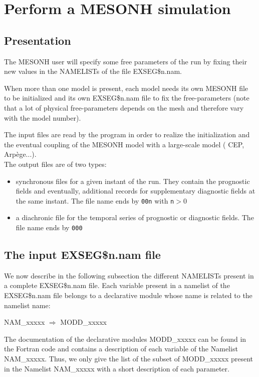 \chapter{ Perform a MESONH simulation} \label{ch:model}


\section{Presentation}

The MESONH user will  
specify some free parameters of the run by fixing their new values in the
NAMELISTs of the file EXSEG\$n.nam. 

When more than one model is present, each model needs its own MESONH file to be
initialized and its own EXSEG\$n.nam file to fix the free-parameters (note that a lot
of physical free-parameters depends on the mesh and therefore vary with the
model number). 

The input files are read by the program in order to realize the initialization and
the eventual coupling of the
MESONH model with a large-scale model ( CEP, Arp\`ege...). \\

The output files are of two types:
\begin{itemize}
\item
synchronous files for a given instant of the run. They contain the prognostic
fields and  eventually,
additional records for supplementary diagnostic  fields at the same instant.
The file name ends by {\tt 00n} with {\tt n}$>$0
\item
a diachronic file for the temporal series of prognostic or diagnostic fields.
The file name ends by {\tt 000}
\end{itemize}

\section{The input EXSEG\$n.nam file}
We now describe in the following subsection the different NAMELISTs present in 
a complete EXSEG\$n.nam file. 
Each variable present in a namelist of the EXSEG\$n.nam file
belongs to a declarative module whose name is related to the namelist name:

NAM\_xxxxx    $\Longrightarrow $ MODD\_xxxxx

The documentation of the
declarative modules  MODD\_xxxxx can be found in the Fortran code and contains 
a description of each variable of the Namelist NAM\_xxxxx. Thus, we 
only give the list of the subset of MODD\_xxxxx present in the Namelist  
NAM\_xxxxx with a short description of each parameter.


